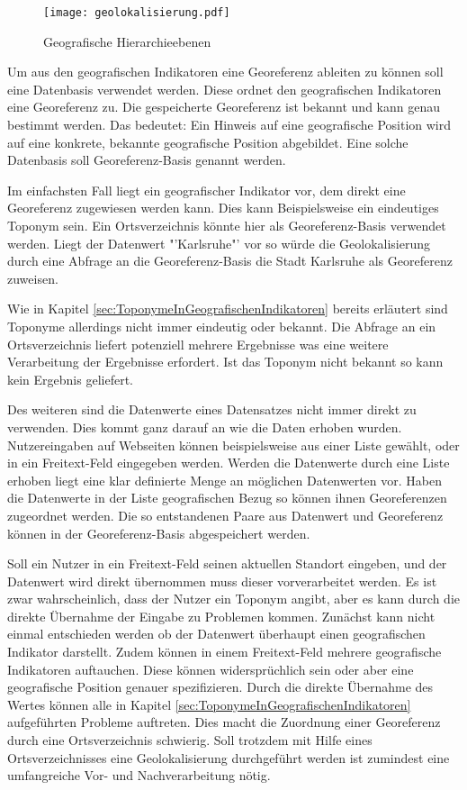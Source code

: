 		\begin{figure}[h!]
		\begin{center}
		\texttt{[image: geolokalisierung.pdf]}
		\caption{Geografische Hierarchieebenen}
		\label{img:geolokalisierung}
		\end{center}
		\end{figure}	

		Um aus den geografischen Indikatoren eine Georeferenz ableiten zu können soll eine Datenbasis verwendet werden.
		Diese ordnet den geografischen Indikatoren eine Georeferenz zu.
		Die gespeicherte Georeferenz ist bekannt und kann genau bestimmt werden. 
		Das bedeutet: Ein Hinweis auf eine geografische Position wird auf eine konkrete, bekannte geografische Position abgebildet.
		Eine solche Datenbasis soll Georeferenz-Basis genannt werden.  

		Im einfachsten Fall liegt ein geografischer Indikator vor, dem direkt eine Georeferenz zugewiesen werden kann.
		Dies kann Beispielsweise ein eindeutiges Toponym sein.	
		Ein Ortsverzeichnis könnte hier als Georeferenz-Basis verwendet werden.
		Liegt der Datenwert "'Karlsruhe"' vor so würde die Geolokalisierung durch eine Abfrage an die Georeferenz-Basis die Stadt Karlsruhe als Georeferenz zuweisen.

		Wie in Kapitel \ref{sec:ToponymeInGeografischenIndikatoren} bereits erläutert sind Toponyme allerdings nicht immer eindeutig oder bekannt. 
		Die Abfrage an ein Ortsverzeichnis liefert potenziell mehrere Ergebnisse was eine weitere Verarbeitung der Ergebnisse erfordert.
		Ist das Toponym nicht bekannt so kann kein Ergebnis geliefert.

		Des weiteren sind die Datenwerte eines Datensatzes nicht immer direkt zu verwenden.
		Dies kommt ganz darauf an wie die Daten erhoben wurden. 
		Nutzereingaben auf Webseiten können beispielsweise aus einer Liste gewählt, oder in ein Freitext-Feld eingegeben werden.
		Werden die Datenwerte durch eine Liste erhoben liegt eine klar definierte Menge an möglichen Datenwerten vor.
		Haben die Datenwerte in der Liste geografischen Bezug so können ihnen Georeferenzen zugeordnet werden.
		Die so entstandenen Paare aus Datenwert und Georeferenz können in der Georeferenz-Basis abgespeichert werden.

		Soll ein Nutzer in ein Freitext-Feld seinen aktuellen Standort eingeben, und der Datenwert wird direkt übernommen muss dieser vorverarbeitet werden.
		Es ist zwar wahrscheinlich, dass der Nutzer ein Toponym angibt, aber es kann durch die direkte Übernahme der Eingabe zu Problemen kommen.
		Zunächst kann nicht einmal entschieden werden ob der Datenwert überhaupt einen geografischen Indikator darstellt.
		Zudem können in einem Freitext-Feld mehrere geografische Indikatoren auftauchen.
		Diese können widersprüchlich sein oder aber eine geografische Position genauer spezifizieren. 
		Durch die direkte Übernahme des Wertes können alle in Kapitel \ref{sec:ToponymeInGeografischenIndikatoren} aufgeführten Probleme auftreten.
		Dies macht die Zuordnung einer Georeferenz durch eine Ortsverzeichnis schwierig.
		Soll trotzdem mit Hilfe eines Ortsverzeichnisses eine Geolokalisierung durchgeführt werden ist zumindest eine umfangreiche Vor- und Nachverarbeitung nötig.

